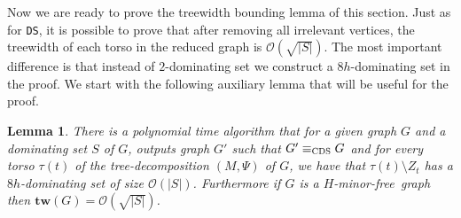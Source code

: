 \documentclass[11pt]{article}
\newtheorem{lemma}{Lemma}
\newcommand{\tw}{{\mathbf{tw}}}
\newcommand{\Hmf}{$H$-minor-free}
\newcommand{\tDS}{{\texttt{\sc DS}}}
\newcommand{\tCDS}{{\texttt{\sc CDS}}}
\newcommand{\cO}{\mathcal{O}}
\begin{document}
Now we are ready to prove the treewidth bounding lemma of this section. 
 Just as for \tDS, it is possible to prove that after removing all irrelevant vertices, the treewidth of each torso in the reduced graph is $\cO(\sqrt{|S|})$. The most important difference is that instead of $2$-dominating set we construct a $8h$-dominating set in the proof.   We start with the following auxiliary lemma that will be useful for the proof. 

 

\begin{lemma}
\label{lem:sumreductioncondomset}
There is a polynomial time algorithm that for  a given graph $G$ and a dominating set $S$ of $G$, outputs graph $G'$ such that $G' \equiv_{\tCDS} G $ and for every torso $\tau(t)$ of the tree-decomposition $(M,\Psi)$ of $G$, we have that $\tau(t)\setminus Z_t$ has a $8h$-dominating set of size $\cO(|S|)$. Furthermore if $G$ is a \Hmf \, graph then $\tw(G)=\cO(\sqrt{|S|})$. 
\end{lemma}
\end{document}
